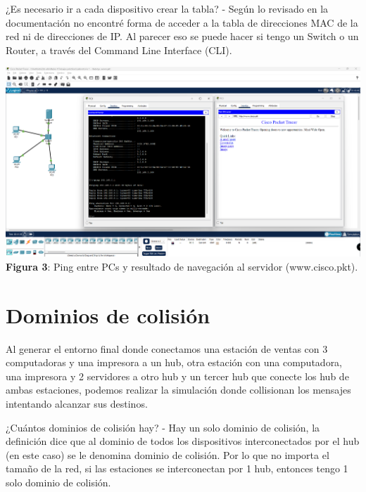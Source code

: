 \documentclass{article}
\begin{document}
    ¿Es necesario ir a cada dispositivo crear la tabla? - Según lo revisado en la documentación no encontré forma de acceder a la tabla de direcciones MAC de la red ni de direcciones de IP. Al parecer eso se puede hacer si tengo un Switch o un Router, a través del Command Line Interface (CLI).

    \begin{center}
        \includegraphics[width=0.85\linewidth]{img_07} 
        \linebreak
        \small {\bfseries Figura 3}: Ping entre PCs y resultado de navegación al servidor (www.cisco.pkt).
    \end{center}
    
    \pagebreak
    \section{Dominios de colisión}
    Al generar el entorno final donde conectamos una estación de ventas con 3 computadoras y una impresora a un hub, otra estación con una computadora, una impresora y 2 servidores a otro hub y un tercer hub que conecte los hub de ambas estaciones, podemos realizar la simulación donde collisionan los mensajes intentando alcanzar sus destinos.

    ¿Cuántos dominios de colisión hay? - Hay un solo dominio de colisión, la definición dice que al dominio de todos los dispositivos interconectados por el hub (en este caso) se le denomina dominio de colisión. Por lo que no importa el tamaño de la red, si las estaciones se interconectan por 1 hub, entonces tengo 1 solo dominio de colisión.
    
\end{document}
